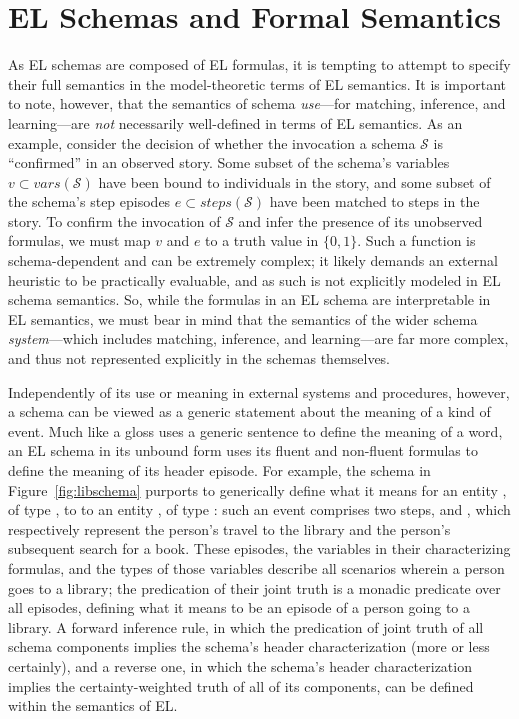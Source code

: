 \section{EL Schemas and Formal Semantics}
\label{sec:formal_semantics}
As EL schemas are composed of EL formulas, it is tempting to attempt to specify their full semantics in the model-theoretic terms of EL semantics. It is important to note, however, that the semantics of schema \textit{use}---for matching, inference, and learning---are \textit{not} necessarily well-defined in terms of EL semantics. As an example, consider the decision of whether the invocation a schema $\mathcal{S}$ is ``confirmed'' in an observed story. Some subset of the schema's variables $v \subset vars(\mathcal{S})$ have been bound to individuals in the story, and some subset of the schema's step episodes $e \subset steps(\mathcal{S})$ have been matched to steps in the story. To confirm the invocation of $\mathcal{S}$ and infer the presence of its unobserved formulas, we must map $v$ and $e$ to a truth value in $\{0, 1\}$. Such a function is schema-dependent and can be extremely complex; it likely demands an external heuristic to be practically evaluable, and as such is not explicitly modeled in EL schema semantics. So, while the formulas in an EL schema are interpretable in EL semantics, we must bear in mind that the semantics of the wider schema \textit{system}---which includes matching, inference, and learning---are far more complex, and thus not represented explicitly in the schemas themselves.

Independently of its use or meaning in external systems and procedures, however, a schema can be viewed as a generic statement about the meaning of a kind of event. Much like a gloss uses a generic sentence to define the meaning of a word, an EL schema in its unbound form uses its fluent and non-fluent formulas to define the meaning of its header episode. For example, the schema in Figure~\ref{fig:libschema} purports to generically define what it means for an entity , of type , to  to an entity , of type : such an event comprises two steps,  and , which respectively represent the person's travel to the library and the person's subsequent search for a book. These episodes, the variables in their characterizing formulas, and the types of those variables describe all scenarios  wherein a person goes to a library; the predication of their joint truth is a monadic predicate over all episodes, defining what it means to be an episode of a person going to a library. A forward inference rule, in which the predication of joint truth of all schema components implies the schema's header characterization (more or less certainly), and a reverse one, in which the schema's header characterization implies the certainty-weighted truth of all of its components, can be defined within the semantics of EL.

